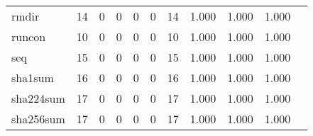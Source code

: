 \begin{longtable}{lp{1.2cm}p{1.2cm}p{1.2cm}p{1.2cm}p{1.2cm}p{1.2cm}p{1.2cm}p{1.2cm}p{1.2cm}p{1.2cm}}
rmdir     &                                    14 &                                                  0 &                                                  0 &                                                  0 &                                                  0 &                                                 14 &                                              1.000 &                                              1.000 &                                              1.000 \\
runcon    &                                    10 &                                                  0 &                                                  0 &                                                  0 &                                                  0 &                                                 10 &                                              1.000 &                                              1.000 &                                              1.000 \\
seq       &                                    15 &                                                  0 &                                                  0 &                                                  0 &                                                  0 &                                                 15 &                                              1.000 &                                              1.000 &                                              1.000 \\
sha1sum   &                                    16 &                                                  0 &                                                  0 &                                                  0 &                                                  0 &                                                 16 &                                              1.000 &                                              1.000 &                                              1.000 \\
sha224sum &                                    17 &                                                  0 &                                                  0 &                                                  0 &                                                  0 &                                                 17 &                                              1.000 &                                              1.000 &                                              1.000 \\
sha256sum &                                    17 &                                                  0 &                                                  0 &                                                  0 &                                                  0 &                                                 17 &                                              1.000 &                                              1.000 &                                              1.000 \\

\end{longtable}

